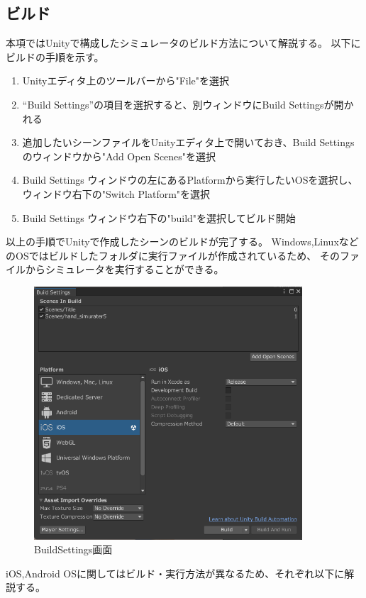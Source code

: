 \documentclass{ltjsreport}
\begin{document}
		\subsection{ビルド}
			本項ではUnityで構成したシミュレータのビルド方法について解説する。
			以下にビルドの手順を示す。
			\begin{enumerate}
				\item Unityエディタ上のツールバーから"File"を選択
				\item ``Build Settings''の項目を選択すると、別ウィンドウにBuild Settingsが開かれる
				\item 追加したいシーンファイルをUnityエディタ上で開いておき、Build Settingsのウィンドウから"Add Open Scenes"を選択
				\item Build Settings ウィンドウの左にあるPlatformから実行したいOSを選択し、ウィンドウ右下の"Switch Platform"を選択
				\item Build Settings ウィンドウ右下の"build"を選択してビルド開始
			\end{enumerate}
			以上の手順でUnityで作成したシーンのビルドが完了する。
			Windows,LinuxなどのOSではビルドしたフォルダに実行ファイルが作成されているため、
			そのファイルからシミュレータを実行することができる。

			\begin{figure}[H]
			\centering
			\includegraphics[width = 10cm]{../figs/BuildSettings.png}
			\caption{BuildSettings画面}
			\label{fig:BuildSettings}
			\end{figure}

			iOS,Android OSに関してはビルド・実行方法が異なるため、それぞれ以下に解説する。
\end{document}
